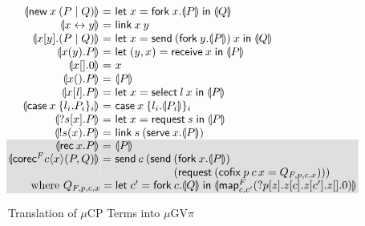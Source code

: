 \documentclass[orivec,envcountsame]{llncs}
\makeatletter
\newcommand{\mapname}{\mathsf{map}}
\newcommand{\map}[3]{\mapname^{#1}_{#2}(#3)}
\newcommand{\mkwd}[1]{\mathsf{#1}}
\newcommand{\link}[2]{#1 \leftrightarrow #2}
\newcommand{\cut}[4]{\mkwd{new}\:#1 \: (#3 \mid #4)}
\newcommand{\replicate}[2]{{!#1(#2)}}
\newcommand{\derelict}[2]{{?#1[#2]}}
\newcommand{\rec}[1]{\mkwd{rec}\:#1}
\newcommand{\corecf}[5]{\mkwd{corec}^{#1} #2 \langle #3 \rangle (#4,#5)}
\newcommand{\clabel}[1]{\mathit{#1}}
\renewcommand{\case}[2]{\mkwd{case}\:#1\:\{#2\}}
\newcommand{\sel}[2]{#1[\clabel{#2}]}
\newcommand{\gvsend}[2]{\mkwd{send}\:#1\:#2}
\newcommand{\gvreceive}[1]{\mkwd{receive}\:#1}
\newcommand{\gvlet}[3]{\mkwd{let}\;#1 = #2\;\mkwd{in}\;#3}
\newcommand{\gvselect}[2]{\mkwd{select}\:#1\:#2}
\newcommand{\gvcase}[2]{\mkwd{case}\:#1\:\{#2\}}
\newcommand{\gvlink}[2]{\mkwd{link}\:#1\:#2}
\newcommand{\gvfork}[2]{\mkwd{fork}\:#1.#2}
\newcommand{\lrkwd}{\mkwd{cofix}}
\newcommand{\gvfix}[3]{\lrkwd\:#1\:#2 = #3}
\newcommand{\gvserve}[2]{\mkwd{serve}\:#1.#2}
\newcommand{\gvrequest}[1]{\mkwd{request}\:#1}
\newcommand{\key}{\mkwd}
\newcommand{\togv}[1]{\llparenthesis #1 \rrparenthesis}
\newcommand{\mucp}{$\mu\mathrm{CP}$\xspace}
\newcommand{\gvpi}{$\mu\mathrm{GV}\pi$\xspace}
\newcommand{\ba}{\begin{array}}
\newcommand{\ea}{\end{array}}
\newcommand{\bl}{\ba[t]{@{}l@{}}}
\newcommand{\el}{\ea}
\newenvironment{equations}{\[\ba{@{}r@{~}c@{~}l@{}}}{\ea\]}
\newcommand\shaderow{\noalign{\vskip-0.4pt}\rowcolor{shade}[0.6mm]}
\makeatother
\begin{document}
\begin{figure}[float]
\small
\begin{equations}
  \togv{\cut{x}{}{P}{Q}} &=&
    \gvlet{x}{\gvfork{x}{\togv{P}}}{\togv{Q}} \\
  \togv{\link{x}{y}} &=& \gvlink{x}{y} \\
  \togv{x[y].(P \mid Q)} &=&
    \gvlet{x}{\gvsend{(\gvfork{y}{\togv{P}})}{x}}{\togv{Q}} \\
  \togv{x(y).P} &=&
    \gvlet{(y,x)}{\gvreceive{x}}{\togv{P}} \\
  \togv{x[].0} &=& x \\
  \togv{x().P} &=& \togv{P} \\
  \togv{\sel{x}{\mathit{l}}.P} &=&
    \gvlet{x}{\gvselect{l}{x}}{\togv{P}} \\
  \togv{\case{x}{l_i.P_i}_i} &=&
    \gvcase{x}{l_i.\togv{P_i}}_i \\
  \togv{\derelict{s}{x}.P} &=&
    \gvlet{x}{\gvrequest{s}}{\togv{P}} \\
  \togv{\replicate{s}{x}.P} &=&
    \gvlink{s}{(\gvserve{x}{\togv{P}})} \\  \shaderow
  \togv{\rec{x}.P} &=& \togv{P} \\ \shaderow
  \togv{\corecf{F}{c}{x}{P}{Q}} &=&
    \key{send}\:c\:(
      \key{send}\:
         \bl
         (\gvfork{x}{\togv{P}}) \\
         (\gvrequest{(\gvfix{p}{c\,x}{Q_{F,p,c,x}})})) \\
         \el \\ \shaderow
\multicolumn{3}{@{}l@{}}
{\qquad\text{where }
  Q_{F,p,c,x} =
    \gvlet{c'}{\gvfork{c}{\togv{Q}}}
          {\togv{\map{F}{c,c'}{\derelict{p}{z}.z[c].z[c'].z[].0}}}}
\end{equations}%
\caption{Translation of \mucp Terms into \gvpi}\label{fig:fromcp}
\end{figure}
\end{document}
